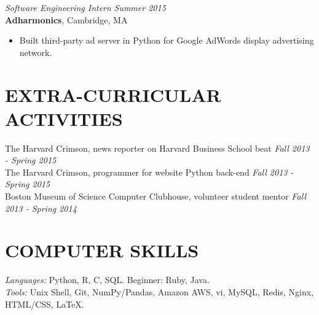 \documentclass{res}
\begin{document}
\begin{resume}
    {\sl Software Engineering Intern} \hfill {\sl Summer 2015} \\
    \textbf{Adharmonics}, Cambridge, MA
    \begin{itemize} \itemsep -2.5pt
        \item Built third-party ad server in Python for Google AdWords display
            advertising network. 
    \end{itemize} 


\section{EXTRA-CURRICULAR ACTIVITIES}      
    The Harvard Crimson, news reporter on Harvard Business School beat \hfill {\sl Fall 2013 - Spring 2015}\\
    The Harvard Crimson, programmer for website Python back-end \hfill {\sl Fall 2013 - Spring 2015}\\
    Boston Museum of Science Computer Clubhouse, volunteer student mentor \hfill {\sl Fall 2013 - Spring 2014}

\section{COMPUTER SKILLS}
    {\sl Languages:} Python, R, C, SQL. Beginner: Ruby, Java. \\
    {\sl Tools:} Unix Shell, Git, NumPy/Pandas, Amazon AWS, vi, MySQL, Redis,
    Nginx, HTML/CSS, LaTeX.
      
\end{resume}
\end{document}
